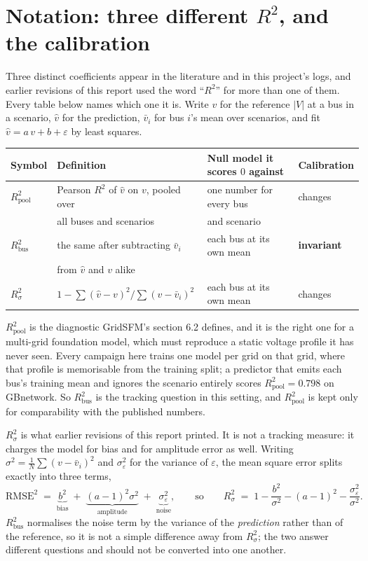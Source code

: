 \documentclass[10pt]{article}
\begin{document}
\section{Notation: three different $R^2$, and the calibration}
\label{sec:r2notation}

Three distinct coefficients appear in the literature and in this project's
logs, and earlier revisions of this report used the word ``$R^2$'' for more
than one of them.  Every table below names which one it is.  Write $v$ for the
reference $|V|$ at a bus in a scenario, $\hat v$ for the prediction,
$\bar v_i$ for bus $i$'s mean over scenarios, and fit
$\hat v = a\,v + b + \varepsilon$ by least squares.

\begin{table}[H]
\centering\footnotesize
\setlength{\tabcolsep}{4pt}
\begin{tabular}{llll}
\toprule
Symbol & Definition & Null model it scores $0$ against & Calibration\\
\midrule
$R^2_{\mathrm{pool}}$ & Pearson $R^2$ of $\hat v$ on $v$, pooled over
  & one number for every bus & changes\\
  & all buses and scenarios & and scenario & \\[2pt]
$R^2_{\mathrm{bus}}$ & the same after subtracting $\bar v_i$
  & each bus at its own mean & \textbf{invariant}\\
  & from $\hat v$ and $v$ alike & & \\[2pt]
$R^2_{\sigma}$ & $1-\sum(\hat v-v)^2/\sum(v-\bar v_i)^2$
  & each bus at its own mean & changes\\
\bottomrule
\end{tabular}
\end{table}

$R^2_{\mathrm{pool}}$ is the diagnostic GridSFM's section 6.2 defines, and it
is the right one for a multi-grid foundation model, which must reproduce a
static voltage profile it has never seen.  Every campaign here trains one model
per grid on that grid, where that profile is memorisable from the training
split; a predictor that emits each bus's training mean and ignores the scenario
entirely scores $R^2_{\mathrm{pool}} = 0.798$ on GBnetwork.  So
$R^2_{\mathrm{bus}}$ is the tracking question in this setting, and
$R^2_{\mathrm{pool}}$ is kept only for comparability with the published
numbers.

$R^2_{\sigma}$ is what earlier revisions of this report printed.  It is not a
tracking measure: it charges the model for bias and for amplitude error as
well.  Writing $\sigma^2=\tfrac{1}{N}\sum(v-\bar v_i)^2$ and
$\sigma_\varepsilon^2$ for the variance of $\varepsilon$, the mean square error
splits exactly into three terms,
\[
  \mathrm{RMSE}^2 \;=\; \underbrace{b^2}_{\text{bias}}
  \;+\;\underbrace{(a-1)^2\sigma^2}_{\text{amplitude}}
  \;+\;\underbrace{\sigma_\varepsilon^2}_{\text{noise}},
  \qquad\text{so}\qquad
  R^2_{\sigma} \;=\; 1-\frac{b^2}{\sigma^2}-(a-1)^2-\frac{\sigma_\varepsilon^2}{\sigma^2}.
\]
$R^2_{\mathrm{bus}}$ normalises the noise term by the variance of the
\emph{prediction} rather than of the reference, so it is not a simple
difference away from $R^2_{\sigma}$; the two answer different questions and
should not be converted into one another.
\end{document}
